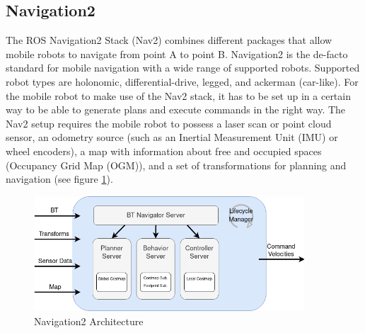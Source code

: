 \begin{table}[ht]
	\centering
	\caption{Turtlebot3 Specifications}
	\label{tab:turtlebot_spec}
	\renewcommand{\arraystretch}{1.5}
\end{table}

\subsection{Navigation2}
\label{subsec:nav2}

The ROS Navigation2 Stack (Nav2) combines different packages that allow mobile robots to navigate from point A to point B. Navigation2 is the de-facto standard for mobile navigation with a wide range of supported robots. Supported robot types are holonomic, differential-drive, legged, and ackerman (car-like). For the mobile robot to make use of the Nav2 stack, it has to be set up in a certain way to be able to generate plans and execute commands in the right way. The Nav2 setup requires the mobile robot to possess a laser scan or point cloud sensor, an odometry source (such as an Inertial Measurement Unit (IMU) or wheel encoders), a map with information about free and occupied spaces (Occupancy Grid Map (OGM)), and a set of transformations for planning and navigation (see figure \ref{fig:nav_architecture}). 

\begin{figure}[ht]
	\centering
	\includegraphics[width=0.9\textwidth]{images/nav2_architecture.png}
	\caption{Navigation2 Architecture \cite{macenski2020}}
	\label{fig:nav_architecture}
\end{figure}

